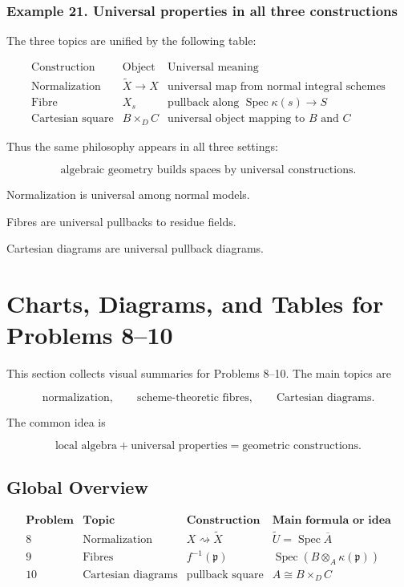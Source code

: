 \documentclass[12pt,a4paper]{article}
\theoremstyle{notespace}
\begin{document}
\subsubsection{Example 21. Universal properties in all three constructions}

The three topics are unified by the following table:

\[
\begin{array}{c|c|c}
	\text{Construction} & \text{Object} & \text{Universal meaning} \\
	\hline
	\text{Normalization} & \widetilde{X}\to X
	&
	\text{universal map from normal integral schemes}
	\\
	\text{Fibre} & X_s
	&
	\text{pullback along } \operatorname{Spec}\kappa(s)\to S
	\\
	\text{Cartesian square} & B\times_D C
	&
	\text{universal object mapping to }B\text{ and }C
\end{array}
\]

Thus the same philosophy appears in all three settings:

\[
\boxed{
	\text{algebraic geometry builds spaces by universal constructions.}
}
\]

Normalization is universal among normal models.

Fibres are universal pullbacks to residue fields.

Cartesian diagrams are universal pullback diagrams.

\section{Charts, Diagrams, and Tables for Problems 8--10}

This section collects visual summaries for Problems 8--10. The main topics are

\[
\text{normalization},\qquad
\text{scheme-theoretic fibres},\qquad
\text{Cartesian diagrams}.
\]

The common idea is

\[
\boxed{
	\text{local algebra}+\text{universal properties}=\text{geometric constructions}.
}
\]

\subsection{Global Overview}

\[
\begin{array}{c|c|c|c}
	\textbf{Problem} & \textbf{Topic} & \textbf{Construction} & \textbf{Main formula or idea} \\
	\hline
	8
	&
	\text{Normalization}
	&
	X\rightsquigarrow \widetilde{X}
	&
	\widetilde{U}=\operatorname{Spec}\overline{A}
	\\
	\hline
	9
	&
	\text{Fibres}
	&
	f^{-1}(\mathfrak{p})
	&
	\operatorname{Spec}\left(B\otimes_A\kappa(\mathfrak{p})\right)
	\\
	\hline
	10
	&
	\text{Cartesian diagrams}
	&
	\text{pullback square}
	&
	A\cong B\times_D C
\end{array}
\]
\end{document}
